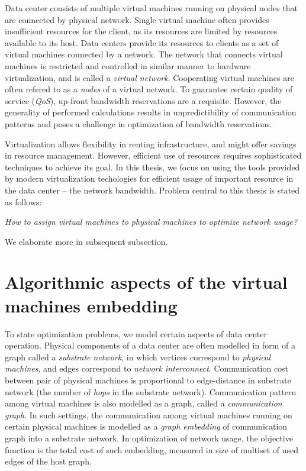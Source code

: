 Data center consists of multiple virtual machines running on physical nodes
that are connected by physical network. Single virtual machine often provides
insufficient resources for the client, as its resources are limited by resources
available to its host. Data centers provide its resources to clients as a set
of virtual machines connected by a network. The network that connects virtual
machines is restricted and controlled in similar manner to hardware
virtualization, and is called a \emph{virtual network}. Cooperating virtual
machines are often refered to as a \emph{nodes} of a virtual network. To
guarantee certain quality of service (\emph{QoS}), up-front bandwidth
reservations are a requisite. However, the generality of performed calculations
results in unpredictibility of communication patterns and poses a challenge in
optimization of bandwidth reservations.

Virtualization allows
flexibility in renting infrastructure, and might offer savings in resource
management. However, efficient use of resources requires sophisticated
techniques to achieve its goal. In this thesis, we focus on using the tools
provided by modern virtualization techologies for efficient usage of important
resource in the data center -- the network bandwidth. Problem central to this
thesis is stated as follows:

\begin{center}
  \emph{How to assign virtual machines to physical machines to optimize network
  usage?}
\end{center}

We elaborate more in subsequent subsection.

\section{Algorithmic aspects of the virtual machines embedding}

To state optimization problems, we model certain aspects of data center operation.
Physical components of a data center are often modelled in form of a graph called a \emph{substrate network}, in which vertices correspond to \emph{physical machines}, and edges correspond to \emph{network interconnect}.
Communication cost between pair of physical machines is proportional to edge-distance in substrate network (the number of \emph{hops} in the substrate network).
Communication pattern among virtual machines is also modelled as a graph, called a \emph{communication graph}.
In such settings, the communication among virtual machines running on certain physical machines is modelled as a \emph{graph embedding} of communication graph into a substrate network.
In optimization of network usage, the objective function is the total cost of such embedding, measured in size of multiset of used edges of the host graph.

